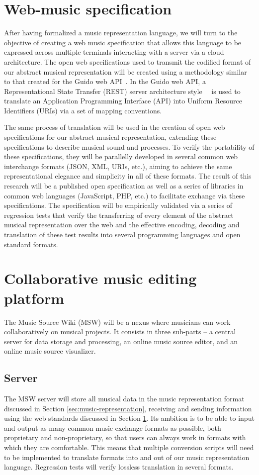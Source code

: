 \documentclass{article}
\begin{document}
\section{Web-music specification}\label{sec:web-music-specification}
After having formalized a music representation language, we will turn to the
objective of creating a web music specification that allows this language to be
expressed across multiple terminals interacting with a server via a cloud
architecture. The open web specifications used to transmit the codified format
of our abstract musical representation will be created using a methodology
similar to that created for the Guido web API~\cite{solomon:2014}.
In the Guido web API, a Representational State Transfer (REST) server architecture
style~\cite{Fielding00}~\cite{richardson2008restful} is used to translate an Application
Programming Interface (API) into Uniform Resource Identifiers (URIs) via a
set of mapping conventions.

The same process of translation will be used in the
creation of open web specifications for our abstract musical representation,
extending these specifications to describe musical sound and processes. To verify
the portability of these specifications, they will be parallelly
developed in several common web interchange formats (JSON, XML, URIs, etc.),
aiming to achieve the same representational elegance and simplicity in all
of these formats. The result of this research will be a published open
specification as well as a series of libraries in common web languages
(JavaScript, PHP, etc.) to facilitate exchange via these specifications. The
specification will be empirically validated via a series of regression tests that
verify the transferring of every element of the abstract musical
representation over the web and the effective encoding, decoding and
translation of these test results into several programming languages and
open standard formats.


\section{Collaborative music editing platform}\label{sec:collaborative-music-editing-platform}
The Music Source Wiki (MSW) will be a nexus where
musicians can work collaboratively on musical projects. It consists in three
sub-parts -- a central server for data storage and processing, an online
music source editor, and an online music source visualizer.
\subsection{Server}
The MSW server will store all musical data in the music representation format
discussed in Section \ref{sec:music-representation}, receiving and sending
information using the web standards discussed in Section
\ref{sec:web-music-specification}.  Its ambition is to be able to input and
output as many common music exchange formats as possible, both proprietary and
non-proprietary, so that users can always work in formats with which they are
comfortable.  This means that multiple conversion scripts will need to be
implemented to translate formats into and out of our music representation
language.  Regression tests will verify lossless translation in several
formats.
\end{document}
